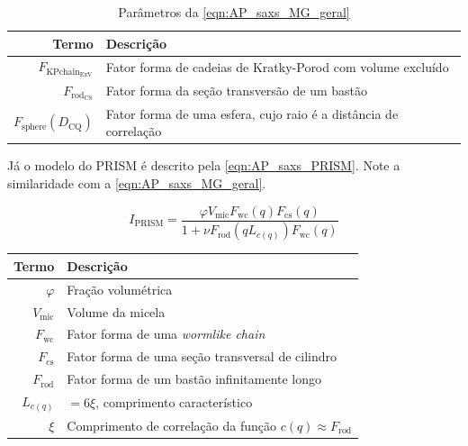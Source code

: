 \begin{apendicesenv}
\begin{table}
    \IBGEtab%
    {\caption{Parâmetros da \autoref{eqn:AP_saxs_MG_geral}}
     \label{tab_ap:fatores_geral} }%
    {\begin{tabular}{r p{8cm}}
    \toprule
    Termo 			& Descrição        						\\
    \midrule
    \(F_{\mathrm{KPchain}_{\mathrm{ExV}}}\)  & Fator forma de cadeias de Kratky-Porod com volume excluído \\
    \(F_{\mathrm{rod}_{\mathrm{CS}}}\)		 & Fator forma da seção transversão de um bastão	\\
    \(F_{\mathrm{sphere}}(D_{\mathrm{CQ}})\) & Fator forma de uma esfera, cujo raio é a distância de correlação \\
    \bottomrule%
    \end{tabular}}
    {}%
\end{table}


Já o modelo do PRISM é descrito pela \autoref{eqn:AP_saxs_PRISM}. Note a similaridade com a \autoref{eqn:AP_saxs_MG_geral}.

\begin{equation}
I_{\mathrm{PRISM}}= \frac{\varphi V_{\mathrm{mic}}F_{\mathrm{wc}}(q)F_{\mathrm{cs}}(q)}{1 + \nu F_{\mathrm{rod}}(qL_{c(q)})F_{\mathrm{wc}}(q)}
\label{eqn:AP_saxs_PRISM}
\end{equation}

\begin{table}
    {%
     \begin{tabular}{r p{8cm}}
     \toprule
     Termo 			& Descrição        						\\
     \midrule
     \(\varphi\)		& Fração volumétrica \\
     \(V_{\mathrm{mic}}\)		& Volume da micela   \\
     \(F_{\mathrm{wc}}\)		& Fator forma de uma \emph{wormlike chain} \\
     \(F_{\mathrm{cs}}\)		& Fator forma de uma seção transversal de cilindro \\ %
     \(F_{\mathrm{rod}}\)		& Fator forma de um bastão infinitamente longo \\
     \(L_{c(q)}\)		& \(=6\xi\), comprimento característico \\
     \(\xi\)			& Comprimento de correlação da função \(c(q) \approx F_{\mathrm{rod}}\) \\
     \bottomrule
     \end{tabular}}%
     {}%
\end{table}



\end{apendicesenv}
